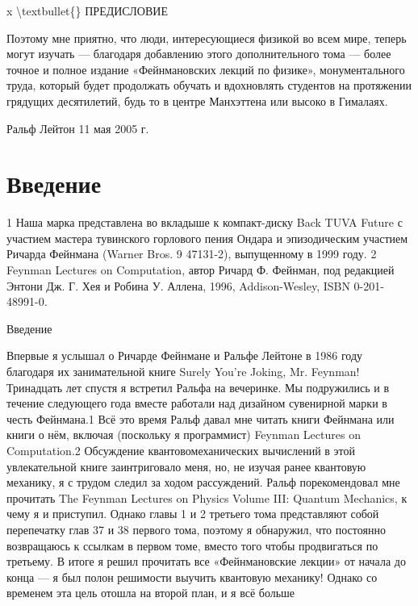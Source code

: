 \documentclass[10pt,oneside]{article}
\begin{document}
x \textbackslash{}textbullet\{\} ПРЕДИСЛОВИЕ\par

Поэтому мне приятно, что люди, интересующиеся физикой во всем мире, теперь могут изучать --- благодаря добавлению этого дополнительного тома --- более точное и полное издание «Фейнмановских лекций по физике», монументального труда, который будет продолжать обучать и вдохновлять студентов на протяжении грядущих десятилетий, будь то в центре Манхэттена или высоко в Гималаях.\par

Ральф Лейтон 11 мая 2005 г.\par

\clearpage
{}
\section*{Введение}
\label{tips-sec-3-введение}
1 Наша марка представлена во вкладыше к компакт-диску Back TUVA Future с участием мастера тувинского горлового пения Ондара и эпизодическим участием Ричарда Фейнмана (Warner Bros. 9 47131-2), выпущенному в 1999 году. 2 Feynman Lectures on Computation, автор Ричард Ф. Фейнман, под редакцией Энтони Дж. Г. Хея и Робина У. Аллена, 1996, Addison-Wesley, ISBN 0-201-48991-0.\par

Введение\par

Впервые я услышал о Ричарде Фейнмане и Ральфе Лейтоне в 1986 году благодаря их занимательной книге Surely You’re Joking, Mr. Feynman! Тринадцать лет спустя я встретил Ральфа на вечеринке. Мы подружились и в течение следующего года вместе работали над дизайном сувенирной марки в честь Фейнмана.1 Всё это время Ральф давал мне читать книги Фейнмана или книги о нём, включая (поскольку я программист) Feynman Lectures on Computation.2 Обсуждение квантовомеханических вычислений в этой увлекательной книге заинтриговало меня, но, не изучая ранее квантовую механику, я с трудом следил за ходом рассуждений. Ральф порекомендовал мне прочитать The Feynman Lectures on Physics Volume III: Quantum Mechanics, к чему я и приступил. Однако главы 1 и 2 третьего тома представляют собой перепечатку глав 37 и 38 первого тома, поэтому я обнаружил, что постоянно возвращаюсь к ссылкам в первом томе, вместо того чтобы продвигаться по третьему. В итоге я решил прочитать все «Фейнмановские лекции» от начала до конца --- я был полон решимости выучить квантовую механику! Однако со временем эта цель отошла на второй план, и я всё больше\par
\end{document}
